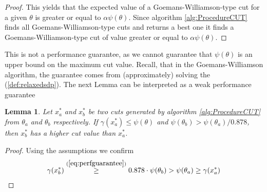 \documentclass[12pt,a4paper]{article}
\theoremstyle{mythm}
\newtheorem{lem}[thm]{Lemma}
\begin{document}
\begin{proof}
This yields that the expected value of a Goemans-Williamson-type cut for a given $ \theta $ is greater or equal to $ \alpha \psi ( \theta)$. 
Since algorithm \ref{alg:ProcedureCUT} finds all Goemans-Williamson-type cuts and returns a best one it finds a Goemans-Williamson-type cut of value greater or equal to $ \alpha \psi ( \theta) $.

\end{proof}
This is not a performance guarantee, as we cannot guarantee that $ \psi ( \theta)  $ is an upper bound on the maximum cut value.
Recall, that in the Goemans-Williamson algorithm, the guarantee comes from (approximately) solving the \SDP (\ref{def:relaxedsdp}).
The next Lemma can be interpreted as a weak performance guarantee
\begin{lem}
Let $ x ^{*} _{ a } $ and $ x ^{*} _{ b } $ be two cuts generated by algorithm \ref{alg:ProcedureCUT} from $ \theta_a $ and $ \theta_b $ respectively.
If $ \gamma ( x ^{ * } _{ a } ) \leq \psi ( \theta) $ and $ \psi ( \theta _{ b } ) > \psi ( \theta_a)/0.878 $, then $ x ^{ * } _{ b }  $ has a higher cut value than $ x ^{ * }
_{ a }  $.
\end{lem} 
\begin{proof}
Using the assumptions we confirm
\begin{align*}
\gamma ( x ^{ * } _{ b } ) \overset{ (\ref{eq:perfguarantee})  }{ \geq  } 0.878 \cdot \psi ( \theta_b) > \psi ( \theta_a) \geq \gamma ( x ^{ * } _{ a } ) 
\end{align*} 
\end{proof}
\end{document}
